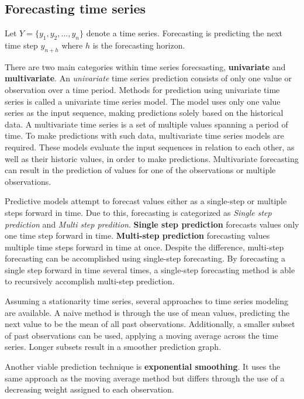 
\subsection{Forecasting time series}
\label{section:BT:forecasting-time-series}
Let  $Y = \{y_1, y_2, ..., y_n\}$ denote a time series.
Forecasting is predicting the next time step $y_{n+h}$ where $h$ is the forecasting horizon.

There are two main categories within time series forecsasting, \textbf{univariate} and \textbf{multivariate}.
An \textit{univariate} time series prediction consists of only one value or observation over a time period.
Methods for prediction using univariate time series is called a univariate time series model.
The model uses only one value series as the input sequence, making predictions solely based on the historical data.
A multivariate time series is a set of multiple values spanning a period of time.
To make predictions with such data, multivariate time series models are required.
These models evaluate the input sequences in relation to each other, as well as their historic values, in order to make predictions.
Multivariate forecasting can result in the prediction of values for one of the observations or multiple observations.


Predictive models attempt to forecast values either as a single-step or multiple steps forward in time.
Due to this, forecasting is categorized as \textit{Single step prediction} and \textit{Multi step predition}.
\textbf{Single step prediction} forecasts values only one time step forward in time.
\textbf{Multi-step prediction} forecasting values multiple time steps forward in time at once.
Despite the difference, multi-step forecasting can be accomplished using single-step forecasting.
By forecasting a single step forward in time several times, a single-step forecasting method is able to recursively accomplish multi-step prediction.


Assuming a stationarity time series, several approaches to time series modeling are available.
A naive method is through the use of mean values, predicting the next value to be the mean of all past observations.
Additionally, a smaller subset of past observations can be used, applying a moving average across the time series.
Longer subsets result in a smoother prediction graph.

Another viable prediction technique is \textbf{exponential smoothing}.
It uses the same approach as the moving average method but differs through the use of
a decreasing weight assigned to each observation.

